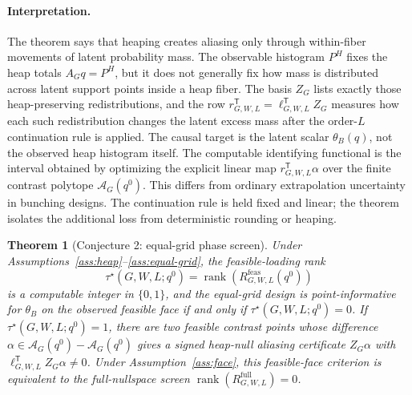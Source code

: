 \documentclass[11pt]{article}
\newcommand{\transpose}{\mathsf{T}}
\theoremstyle{definition}
\theoremstyle{plain}
\newtheorem{theorem}{Theorem}
\theoremstyle{remark}
\begin{document}
\paragraph{Interpretation.}
The theorem says that heaping creates aliasing only through within-fiber movements of latent probability mass.  The observable histogram \(P^H\) fixes the heap totals \(A_Gq=P^H\), but it does not generally fix how mass is distributed across latent support points inside a heap fiber.  The basis \(Z_G\) lists exactly those heap-preserving redistributions, and the row \(r_{G,W,L}^{\transpose}=\ell_{G,W,L}^{\transpose}Z_G\) measures how each such redistribution changes the latent excess mass after the order-\(L\) continuation rule is applied.  The causal target is the latent scalar \(\theta_B(q)\), not the observed heap histogram itself.  The computable identifying functional is the interval obtained by optimizing the explicit linear map \(r_{G,W,L}^{\transpose}\alpha\) over the finite contrast polytope \(\mathcal{A}_G(q^0)\).  This differs from ordinary extrapolation uncertainty in bunching designs.  The continuation rule is held fixed and linear; the theorem isolates the additional loss from deterministic rounding or heaping.

\begin{theorem}[Conjecture 2: equal-grid phase screen]\label{thm:phase}
Under Assumptions~\ref{ass:heap}--\ref{ass:equal-grid}, the feasible-loading rank \[
\tau^\star(G,W,L;q^0)=\operatorname{rank}(R^{\mathrm{feas}}_{G,W,L}(q^0))
\] is a computable integer in \(\{0,1\}\), and the equal-grid design is point-informative for \(\theta_B\) on the observed feasible face if and only if \(\tau^\star(G,W,L;q^0)=0\). If \(\tau^\star(G,W,L;q^0)=1\), there are two feasible contrast points whose difference \(\alpha\in\mathcal{A}_G(q^0)-\mathcal{A}_G(q^0)\) gives a signed heap-null aliasing certificate \(Z_G\alpha\) with \(\ell_{G,W,L}^{\transpose}Z_G\alpha\neq0\). Under Assumption~\ref{ass:face}, this feasible-face criterion is equivalent to the full-nullspace screen \(\operatorname{rank}(R^{\mathrm{full}}_{G,W,L})=0\).
\end{theorem}
\end{document}

